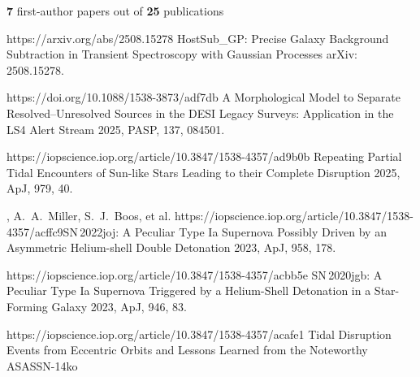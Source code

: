 


\begin{cvpubs}

\cvpub
{ %
{\bf 7} first-author papers out of {\bf 25} publications
}
\cvpub
{ %
\begin{cvitems}
    \item {}
    {}
    {https://arxiv.org/abs/2508.15278}
    {HostSub\_GP: Precise Galaxy Background Subtraction in Transient Spectroscopy with Gaussian Processes}
    {arXiv: 2508.15278.}
    \item {}
    {}
    {https://doi.org/10.1088/1538-3873/adf7db}
    {A Morphological Model to Separate Resolved--Unresolved Sources in the DESI Legacy Surveys: Application in the LS4 Alert Stream}
    {2025, PASP, 137, 084501.}
    \item {}
    {}
    {https://iopscience.iop.org/article/10.3847/1538-4357/ad9b0b}
    {Repeating Partial Tidal Encounters of Sun-like Stars Leading to their Complete Disruption}
    {2025, ApJ, 979, 40.}
    \item \cvsubpub
    {\Cliu, A.~A.~Miller, S.~J.~Boos, et al.}
    {}
    {https://iopscience.iop.org/article/10.3847/1538-4357/acffc9}{SN\,2022joj: A Peculiar Type Ia Supernova Possibly Driven by an Asymmetric Helium-shell Double Detonation}
    {2023, ApJ, 958, 178.}
    \item {}
    {}
    {https://iopscience.iop.org/article/10.3847/1538-4357/acbb5e}
    {SN\,2020jgb: A Peculiar Type Ia Supernova Triggered by a Helium-Shell Detonation in a Star-Forming Galaxy}
    {2023, ApJ, 946, 83.}
    \item {}
    {}
    {https://iopscience.iop.org/article/10.3847/1538-4357/acafe1}
    {Tidal Disruption Events from Eccentric Orbits and Lessons Learned from the Noteworthy ASASSN-14ko}

\end{cvitems}}
\end{cvpubs}

